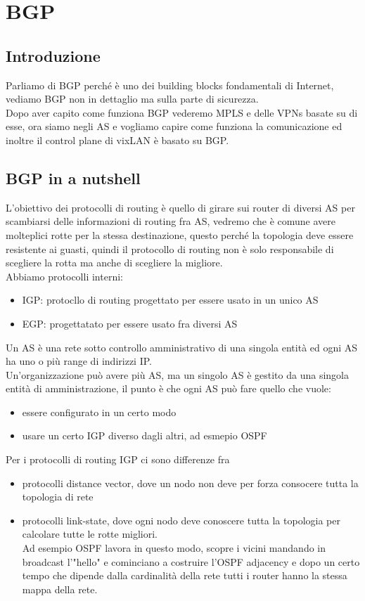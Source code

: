 \documentclass[12pt, oneside]{extbook} %
\begin{document}
\chapter*{BGP}

\section{Introduzione}
Parliamo di BGP perché è uno dei building blocks fondamentali di Internet, vediamo BGP non in dettaglio ma sulla parte di sicurezza.
\\Dopo aver capito come funziona BGP vederemo MPLS e delle VPNs basate su di esse, ora siamo negli AS e vogliamo capire come funziona la comunicazione ed inoltre il control plane di vixLAN è basato su BGP.

\section{BGP in a nutshell}
L'obiettivo dei protocolli di routing è quello di girare sui router di diversi AS per scambiarsi delle informazioni di routing fra AS, vedremo che è comune avere molteplici rotte per la stessa destinazione, questo perché la topologia deve essere resistente ai guasti, quindi il protocollo di routing non è solo responsabile di scegliere la rotta ma anche di scegliere la migliore.
\\Abbiamo protocolli interni:
\
\begin{itemize}
	\item IGP: protocllo di routing progettato per essere usato in un unico AS
	\item EGP: progettatato per essere usato fra diversi AS
\end{itemize}
Un AS è una rete sotto controllo amministrativo di una singola entità ed ogni AS ha uno o più range di indirizzi IP.
\\Un'organizzazione può avere più AS, ma un singolo AS è gestito da una singola entità di amministrazione, il punto è che ogni AS può fare quello che vuole:
\begin{itemize}
	\item essere configurato in un certo modo
	\item usare un certo IGP diverso dagli altri, ad esmepio OSPF
\end{itemize}

Per i protocolli di routing IGP ci sono differenze fra
\begin{itemize}
	\item protocolli distance vector, dove un nodo non deve per forza consocere tutta la topologia di rete
	\item protocolli link-state, dove ogni nodo deve conoscere tutta la topologia per calcolare tutte le rotte migliori.
	\\Ad esempio OSPF lavora in questo modo, scopre i vicini mandando in broadcast l'"hello" e cominciano a costruire l'OSPF adjacency e dopo un certo tempo che dipende dalla cardinalità della rete tutti i router hanno la stessa mappa della rete.
\end{itemize}
\end{document}
